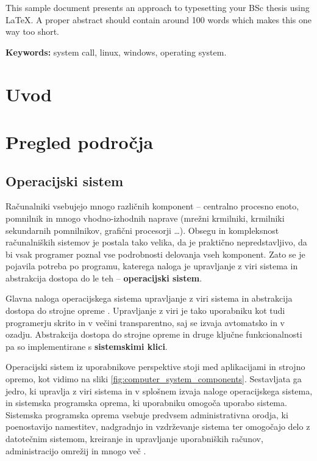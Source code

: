 \documentclass[a4paper,12pt,openright]{book}
\newcommand{\tkeywordsEn}{system call, linux, windows, operating system}
\newcommand{\clearemptydoublepage}{\newpage{\pagestyle{empty}\cleardoublepage}}
\begin{document}
\noindent This sample document presents an approach to typesetting your BSc thesis using \LaTeX. 
A proper abstract should contain around 100 words which makes this one way too short.
\bigskip

\noindent\textbf{Keywords:} \tkeywordsEn.
\clearemptydoublepage

\mainmatter
\setcounter{page}{1}
\pagestyle{fancy}

\chapter{Uvod}


\chapter{Pregled področja}

\section{Operacijski sistem}

Računalniki vsebujejo mnogo različnih komponent -- centralno procesno enoto, pomnilnik in mnogo vhodno-izhodnih naprave (mrežni krmilniki, krmilniki sekundarnih pomnilnikov, grafični procesorji \dots).
Obsegu in kompleksnost računalniških sistemov je postala tako velika, da je praktično nepredstavljivo, da bi vsak programer poznal vse podrobnosti delovanja vseh komponent.
Zato se je pojavila potreba po programu, katerega naloga je upravljanje z viri sistema in abstrakcija dostopa do le teh -- \textbf{operacijski sistem}.

Glavna naloga operacijskega sistema upravljanje z viri sistema in abstrakcija dostopa do strojne opreme \cite{Tanenbaum_Bos_2023}.
Upravljanje z viri je tako uporabniku kot tudi programerju skrito in v večini transparentno, saj se izvaja avtomatsko in v ozadju.
Abstrakcija dostopa do strojne opreme in druge ključne funkcionalnosti pa so implementirane s \textbf{sistemskimi klici}.

Operacijski sistem iz uporabnikove perspektive stoji med aplikacijami in strojno opremo, kot vidimo na sliki \ref{fig:computer_system_components}.
Sestavljata ga jedro, ki upravlja z viri sistema in v splošnem izvaja naloge operacijskega sistema, in sistemska programska oprema, ki uporabniku omogoča uporabo sistema.
Sistemska programska oprema vsebuje predvsem administrativna orodja, ki poenostavijo namestitev, nadgradnjo in vzdrževanje sistema ter omogočajo delo z datotečnim sistemom, kreiranje in upravljanje uporabniških računov, administracijo omrežij in mnogo več \cite{Silberschatz_Galvin_Gagne_2018}.
\end{document}

